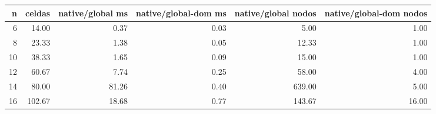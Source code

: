 \begin{tabular}{rrrrrr}
\toprule
n & celdas & native/global ms & native/global-dom ms & native/global nodos & native/global-dom nodos \\
\midrule
6 & 14.00 & 0.37 & 0.03 & 5.00 & 1.00 \\
8 & 23.33 & 1.38 & 0.05 & 12.33 & 1.00 \\
10 & 38.33 & 1.65 & 0.09 & 15.00 & 1.00 \\
12 & 60.67 & 7.74 & 0.25 & 58.00 & 4.00 \\
14 & 80.00 & 81.26 & 0.40 & 639.00 & 5.00 \\
16 & 102.67 & 18.68 & 0.77 & 143.67 & 16.00 \\
\bottomrule
\end{tabular}
